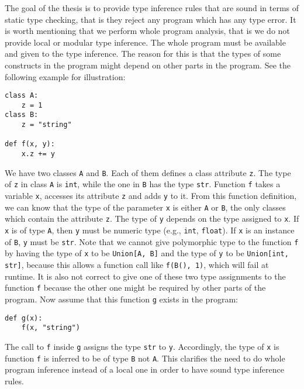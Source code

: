 The goal of the thesis is to provide type inference rules that are sound in terms of static type checking, that is they reject any program which has any type error. It is worth mentioning that we perform whole program analysis, that is we do not provide local or modular type inference. The whole program must be available and given to the type inference. The reason for this is that the types of some constructs in the program might depend on other parts in the program. See the following example for illustration:
\begin{lstlisting}
class A:
	z = 1
class B:
	z = "string"
	
def f(x, y):
	x.z += y
\end{lstlisting}
We have two classes \lstinline|A| and \lstinline|B|. Each of them defines a class attribute \lstinline|z|. The type of \lstinline|z| in class \lstinline|A| is \lstinline|int|, while the one in \lstinline|B| has the type \lstinline|str|. Function \lstinline|f| takes a variable \lstinline|x|, accesses its attribute \lstinline|z| and adds \lstinline|y| to it. From this function definition, we can know that the type of the parameter \lstinline|x| is either \lstinline|A| or \lstinline|B|, the only classes which contain the attribute \lstinline|z|. The type of \lstinline|y| depends on the type assigned to \lstinline|x|. If \lstinline|x| is of type \lstinline|A|, then \lstinline|y| must be numeric type (e.g., \lstinline|int|, \lstinline|float|). If \lstinline|x| is an instance of \lstinline|B|, \lstinline|y| must be \lstinline|str|. Note that we cannot give polymorphic type to the function \lstinline|f| by having the type of \lstinline|x| to be \lstinline|Union[A, B]| and the type of \lstinline|y| to be \lstinline|Union[int, str]|, because this allows a function call like \lstinline|f(B(), 1)|, which will fail at runtime. It is also not correct to give one of these two type assignments to the function \lstinline|f| because the other one might be required by other parts of the program. Now assume that this function \lstinline|g| exists in the program:
\begin{lstlisting}
def g(x):
	f(x, "string")
\end{lstlisting}
The call to \lstinline|f| inside \lstinline|g| assigns the type \lstinline|str| to \lstinline|y|. Accordingly, the type of \lstinline|x| is function \lstinline|f| is inferred to be of type \lstinline|B| not \lstinline|A|. This clarifies the need to do whole program inference instead of a local one in order to have sound type inference rules.

